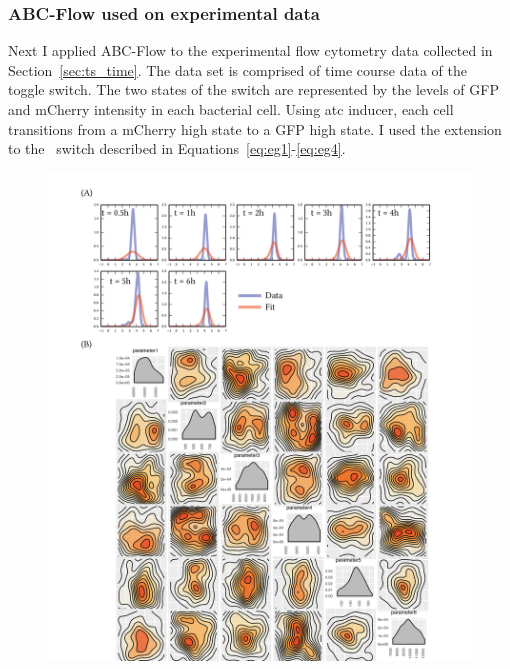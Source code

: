 



\clearpage
\subsubsection{ABC-Flow used on experimental data}
 
Next I applied ABC-Flow to the experimental flow cytometry data collected in Section~\ref{sec:ts_time}. The data set is comprised of time course data of the~\textcite{Litcofsky:2012gr} toggle switch. The two states of the switch are represented by the levels of GFP and mCherry intensity in each bacterial cell. Using \acrshort{atc} inducer, each cell transitions from a mCherry high state to a GFP high state. I used the extension to the~\textcite{Gardner:2000vha} switch described in Equations~\ref{eq:eg1}-\ref{eq:eg4}.

 
\begin{figure}[htbp]
\centering
	\includegraphics[scale=0.6]{chapterABCFlow/images/1D_real_res.png}
	\caption[LoF caption]{\label{fig:1d-real-res}}
\end{figure}




